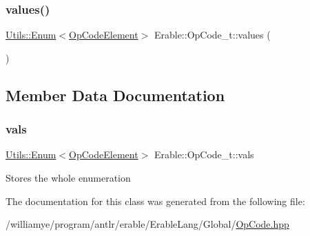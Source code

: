 \mbox{\label{class_erable_1_1_op_code__t_a3af521f1bf56353a26915479aa122cd5}} 
\subsubsection{\texorpdfstring{values()}{values()}}
{\footnotesize\ttfamily \mbox{\hyperlink{class_erable_1_1_utils_1_1_enum}{Utils\+::\+Enum}}$<$\mbox{\hyperlink{class_erable_1_1_op_code_element}{Op\+Code\+Element}}$>$ Erable\+::\+Op\+Code\+\_\+t\+::values (\begin{DoxyParamCaption}{ }\end{DoxyParamCaption})\hspace{0.3cm}{\ttfamily [inline]}}



\subsection{Member Data Documentation}
\mbox{\label{class_erable_1_1_op_code__t_ae2fe5eac3128b065de47103785ba8ea1}} 
\subsubsection{\texorpdfstring{vals}{vals}}
{\footnotesize\ttfamily \mbox{\hyperlink{class_erable_1_1_utils_1_1_enum}{Utils\+::\+Enum}}$<$\mbox{\hyperlink{class_erable_1_1_op_code_element}{Op\+Code\+Element}}$>$ Erable\+::\+Op\+Code\+\_\+t\+::vals}

Stores the whole enumeration 

The documentation for this class was generated from the following file\+:\begin{DoxyCompactItemize}
\item 
/williamye/program/antlr/erable/\+Erable\+Lang/\+Global/\mbox{\hyperlink{_op_code_8hpp}{Op\+Code.\+hpp}}\end{DoxyCompactItemize}
